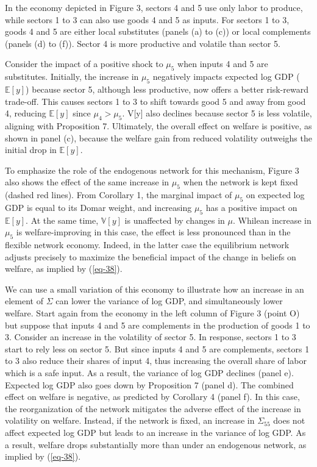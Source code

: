 \documentclass[11pt]{article}
\theoremstyle{definition}
\begin{document}
	In the economy depicted in Figure 3, sectors 4 and 5 use only labor to produce, while sectors 1 to 3 can also use goods 4 and 5 as inputs. For sectors 1 to 3, goods 4 and 5 are either local substitutes (panels (a) to (c)) or local complements (panels (d) to (f)). Sector 4 is more productive and volatile than sector 5.
	
	Consider the impact of a positive shock to $\mu_5$ when inputs 4 and 5 are substitutes. Initially, the increase in $\mu_5$ negatively impacts expected log GDP ($\mathbb{E}[y]$) because sector 5, although less productive, now offers a better risk-reward trade-off. This causes sectors 1 to 3 to shift towards good 5 and away from good 4, reducing $\mathbb{E}[y]$ since $\mu_4 > \mu_5$. V[y] also declines because sector 5 is less volatile, aligning with Proposition 7. Ultimately, the overall effect on welfare is positive, as shown in panel (c), because the welfare gain from reduced volatility outweighs the initial drop in $\mathbb{E}[y]$.
	
	To emphasize the role of the endogenous network for this mechanism, Figure 3 also shows the effect of the same increase in $\mu_5$ when the network is kept fixed (dashed red lines). From Corollary 1, the marginal impact of $\mu_5$ on expected log GDP is equal to its Domar weight, and increasing $\mu_5$ has a positive impact on $\mathbb{E}[y]$. At the same time, $\mathbb{V}[y]$ is unaffected by changes in $\mu$. Whilean increase in $\mu_5$ is welfare-improving in this case, the effect is less pronounced than in the flexible network economy. Indeed, in the latter case the equilibrium network adjusts precisely to maximize the beneficial impact of the change in beliefs on welfare, as implied by (\ref{eq-38}).
	
	We can use a small variation of this economy to illustrate how an increase in an element of $\Sigma$ can lower the variance of log GDP, and simultaneously lower welfare. Start again from the economy in the left column of Figure 3 (point O) but suppose that inputs 4 and 5 are complements in the production of goods 1 to 3. Consider an increase in the volatility of sector 5. In response, sectors 1 to 3 start to rely less on sector 5. But since inputs 4 and 5 are complements, sectors 1 to 3 also reduce their shares of input 4, thus increasing the overall share of labor which is a safe input. As a result, the variance of log GDP declines (panel e). Expected log GDP also goes down by Proposition 7 (panel d). The combined effect on welfare is negative, as predicted by Corollary 4 (panel f). In this case, the reorganization of the network mitigates the adverse effect of the increase in volatility on welfare. Instead, if the network is fixed, an increase in $\Sigma_{55}$ does not affect expected log GDP but leads to an increase in the variance of log GDP. As a result, welfare drops substantially more than under an endogenous network, as implied by (\ref{eq-38}).
	
\end{document}
